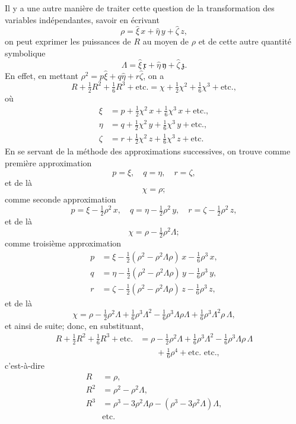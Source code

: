 \documentclass[11pt,a4paper]{book}
\theoremstyle{plain}
\begin{document}
Il y a une autre mani\`{e}re de traiter cette question de la transformation des variables ind\'{e}pendantes, savoir en \'{e}crivant
\[
\rho=\hat{\xi}\,x+\hat{\eta}\,y+\hat{\zeta}\,z,
\]
on peut exprimer les puissances de $R$ au moyen de $\rho$ et de cette autre quantit\'{e} symbolique
\[
\Lambda=\hat{\xi}\,\mathfrak{x}+\hat{\eta}\,\mathfrak{y}+\hat{\zeta}\,\mathfrak{z}.
\]
En effet, en mettant $\rho^2=p\hat{\xi}+q\hat{\eta}+r\hat{\zeta}$, on a
\[
R+\tfrac{1}{2}R^2+\tfrac{1}{6}R^3+\text{etc.}=\chi+\tfrac{1}{2}\chi^2+\tfrac{1}{6}\chi^3+\text{etc.},
\]
o\`{u}
\begin{align*}
\xi &= p+\tfrac{1}{2}\chi^2\,x+\tfrac{1}{6}\chi^3\,x+\text{etc.},\\
\eta &= q+\tfrac{1}{2}\chi^2\,y+\tfrac{1}{6}\chi^3\,y+\text{etc.},\\
\zeta &= r+\tfrac{1}{2}\chi^2\,z+\tfrac{1}{6}\chi^3\,z+\text{etc.}
\end{align*}
En se servant de la m\'{e}thode des approximations successives, on trouve comme premi\`{e}re approximation
\[
p=\xi,\quad q=\eta,\quad r=\zeta,
\]
et de l\`{a}
\[
\chi=\rho;
\]
comme seconde approximation
\[
p=\xi-\tfrac{1}{2}\rho^2\,x,\quad q=\eta-\tfrac{1}{2}\rho^2\,y,\quad r=\zeta-\tfrac{1}{2}\rho^2\,z,
\]
et de l\`{a}
\[
\chi=\rho-\tfrac{1}{2}\rho^2\Lambda;
\]
comme troisi\`{e}me approximation
\begin{align*}
p &= \xi-\tfrac{1}{2}(\rho^2-\rho^2\Lambda\rho)\,x-\tfrac{1}{6}\rho^3\,x,\\
q &= \eta-\tfrac{1}{2}(\rho^2-\rho^2\Lambda\rho)\,y-\tfrac{1}{6}\rho^3\,y,\\
r &= \zeta-\tfrac{1}{2}(\rho^2-\rho^2\Lambda\rho)\,z-\tfrac{1}{6}\rho^3\,z,
\end{align*}
et de l\`{a}
\[
\chi=\rho-\tfrac{1}{2}\rho^2\Lambda+\tfrac{1}{6}\rho^3\Lambda^2-\tfrac{1}{6}\rho^3\Lambda\rho\Lambda+\tfrac{1}{6}\rho^3\Lambda^2\rho\,\Lambda,
\]
et ainsi de suite; donc, en substituant,
\begin{align*}
R+\tfrac{1}{2}R^2+\tfrac{1}{6}R^3+\text{etc.}&=\rho-\tfrac{1}{2}\rho^2\Lambda+\tfrac{1}{6}\rho^3\Lambda^2-\tfrac{1}{6}\rho^3\Lambda\rho\,\Lambda\\
&\qquad +\tfrac{1}{6}\rho^4+\text{etc.\ etc.},
\end{align*}
c'est-\`{a}-dire
\begin{align*}
R&=\rho,\\
R^2&=\rho^2-\rho^2\Lambda,\\
R^3&=\rho^3-3\rho^2\Lambda\rho-(\rho^3-3\rho^2\Lambda)\Lambda,\\
&\text{etc.}
\end{align*}
\end{document}
